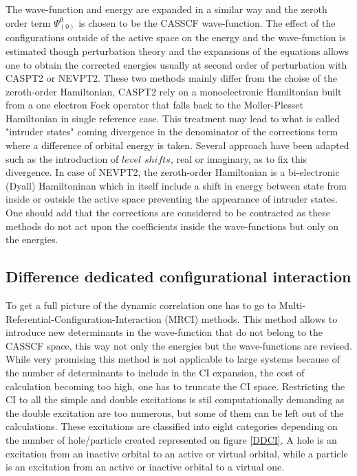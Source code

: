 \documentclass[10pt]{report}
\numberwithin{equation}{section}
\begin{document}
The wave-function and energy are expanded in a similar way and the zeroth order term $\Psi_{(0)}^{0}$ is chosen to be the CASSCF wave-function. 
The effect of the configurations outside of the active space on the energy and the wave-function is estimated though perturbation theory and the expansions of the equations allows one to obtain the corrected energies
usually at second order of perturbation with CASPT2 or NEVPT2. These two methods mainly differ from the choise of the zeroth-order Hamiltonian, CASPT2 rely on a monoelectronic Hamiltonian built from a one electron Fock operator that falls back to the Moller-Plesset Hamiltonian in single reference case. 
This treatment may lead to what is called "intruder states" coming divergence in the denominator of the corrections term where a difference of orbital energy is taken. Several approach have been adapted such as the introduction of  $level$ $shifts$, real or imaginary, as to fix this divergence.
In case of NEVPT2, the zeroth-order Hamiltonian is a bi-electronic (Dyall) Hamiltoninan which in itself include a shift in energy between state from inside or outside the active space preventing the appearance of intruder states.
One should add that the corrections are considered to be contracted as these methods do not act upon the coefficients inside the wave-functions but only on the energies.

\subsection{Difference dedicated configurational interaction}

To get a full picture of the dynamic correlation one has to go to Multi-Referential-Configuration-Interaction (MRCI) methods.
This method allows to introduce new determinants in the wave-function that do not belong to the CASSCF space, this way not only the energies but the wave-functions are revised.
While very promising this method is not applicable to large systems because of the number of determinants to include in the CI expansion, the cost of calculation becoming too high, one has to truncate the CI space.
Restricting the CI to all the simple and double excitations is stil computationally demanding as the double excitation are too numerous, but some of them can be left out of the calculations. 
These excitations are classified into eight categories depending on the number of hole/particle created represented on figure \ref{DDCI}. 
A hole is an excitation from an inactive orbital to an active or virtual orbital, while a particle is an excitation from an active or inactive orbital to a virtual one.
\end{document}
